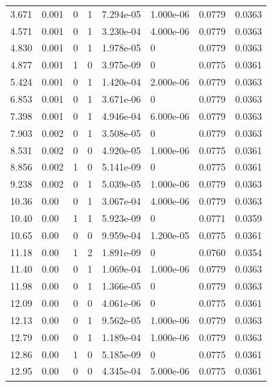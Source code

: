 \documentclass[preview]{standalone}
\begin{document}
{{\begin{tabular}{L{1.2cm}C{1.2cm} C{0.3cm}C{0.5cm} C{1.4cm}C{1.4cm} C{1.4cm}C{1.4cm}}
  3.671  &  0.001  & 0     &  1 &  7.294e-05  & 1.000e-06  & 0.0779 &  0.0363   \\ 
  4.571  &  0.001  & 0     &  1 &  3.230e-04  & 4.000e-06  & 0.0779 &  0.0363   \\ 
  4.830  &  0.001  & 0     &  1 &  1.978e-05  & 0  & 0.0779 &  0.0363   \\ 
  4.877  &  0.001  & 1     &  0 &  3.975e-09  & 0  & 0.0775 &  0.0361   \\ 
  5.424  &  0.001  & 0     &  1 &  1.420e-04  & 2.000e-06  & 0.0779 &  0.0363   \\ 
  6.853  &  0.001  & 0     &  1 &  3.671e-06  & 0  & 0.0779 &  0.0363   \\ 
  7.398  &  0.001  & 0     &  1 &  4.946e-04  & 6.000e-06  & 0.0779 &  0.0363   \\ 
  7.903  &  0.002  & 0     &  1 &  3.508e-05  & 0  & 0.0779 &  0.0363   \\ 
  8.531  &  0.002  & 0     &  0 &  4.920e-05  & 1.000e-06  & 0.0775 &  0.0361   \\ 
  8.856  &  0.002  & 1     &  0 &  5.141e-09  & 0  & 0.0775 &  0.0361   \\ 
  9.238  &  0.002  & 0     &  1 &  5.039e-05  & 1.000e-06  & 0.0779 &  0.0363   \\ 
  10.36  &  0.00  & 0     &  1 &  3.067e-04  & 4.000e-06  & 0.0779 &  0.0363   \\ 
  10.40  &  0.00  & 1     &  1 &  5.923e-09  & 0  & 0.0771 &  0.0359   \\ 
  10.65  &  0.00  & 0     &  0 &  9.959e-04  & 1.200e-05  & 0.0775 &  0.0361   \\ 
  11.18  &  0.00  & 1     &  2 &  1.891e-09  & 0  & 0.0760 &  0.0354   \\ 
  11.40  &  0.00  & 0     &  1 &  1.069e-04  & 1.000e-06  & 0.0779 &  0.0363   \\ 
  11.98  &  0.00  & 0     &  1 &  1.366e-05  & 0  & 0.0779 &  0.0363   \\ 
  12.09  &  0.00  & 0     &  0 &  4.061e-06  & 0  & 0.0775 &  0.0361   \\ 
  12.13  &  0.00  & 0     &  1 &  9.562e-05  & 1.000e-06  & 0.0779 &  0.0363   \\ 
  12.79  &  0.00  & 0     &  1 &  1.189e-04  & 1.000e-06  & 0.0779 &  0.0363   \\ 
  12.86  &  0.00  & 1     &  0 &  5.185e-09  & 0  & 0.0775 &  0.0361   \\ 
  12.95  &  0.00  & 0     &  0 &  4.345e-04  & 5.000e-06  & 0.0775 &  0.0361   \\ 

\end{tabular}}}
\end{document}

